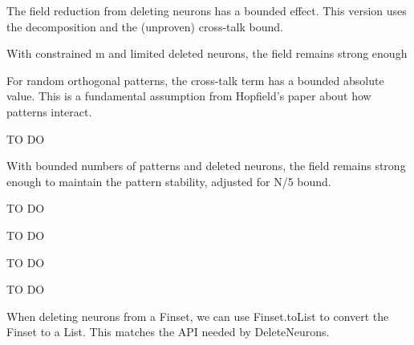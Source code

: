 \begin{lemma}\label{deleted_field_bound}
The field reduction from deleting neurons has a bounded effect.
This version uses the decomposition and the (unproven) cross-talk bound.
\end{lemma}

\begin{lemma}\label{field_remains_sufficient}
\leanok
With constrained m and limited deleted neurons, the field remains strong enough
\end{lemma}

\begin{lemma}\label{bound_cross_talk_term_abs}
\leanok
For random orthogonal patterns, the cross-talk term has a bounded absolute value.
This is a fundamental assumption from Hopfield's paper about how patterns interact.
\end{lemma}

\begin{lemma}\label{deleted_field_product_bound}
TO DO
\end{lemma}

\begin{lemma}\label{field_remains_sufficient_for_N_div_5}
With bounded numbers of patterns and deleted neurons, the field remains strong enough
    to maintain the pattern stability, adjusted for N/5 bound.
\end{lemma}

\begin{lemma}\label{hebbian_deleted_threshold_is_zero}
TO DO
\end{lemma}

\begin{lemma}\label{net_input_at_non_deleted_neuron}
TO DO
\end{lemma}

\begin{lemma}\label{product_net_input_activation_at_non_deleted_neuron}
TO DO
\end{lemma}

\begin{definition}\label{non_deleted_neuron_maintains_sign_of_activation}
TO DO
\end{definition}

\begin{definition}\label{DeleteNeurons_with_Finset}
When deleting neurons from a Finset, we can use Finset.toList to convert the Finset to a List.
This matches the API needed by DeleteNeurons.
\end{definition}

